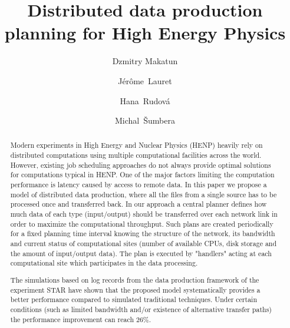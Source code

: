 \documentclass{svjour3}                     %
\begin{document}
\title{Distributed data production planning for High Energy Physics}

\author{Dzmitry Makatun         \and
		J\'er\^ome~Lauret		\and
		Hana~Rudov\'a			\and
		Michal~\v{S}umbera	
}


\maketitle

\begin{abstract}
Modern experiments in High Energy and Nuclear Physics (HENP) heavily rely on distributed computations using multiple computational facilities across the world. However, existing job scheduling approaches do not always provide optimal solutions for computations typical in HENP. One of the major factors limiting the computation performance is latency caused by access to remote data. In this paper we propose a model of distributed data production, where all the files from a single source has to be processed once and transferred back. In our approach a central planner defines how much data of each type (input/output) should be transferred over each network link in order to maximize the computational throughput. Such plans are created periodically for a fixed planning time interval knowing the structure of the network, its bandwidth and current status of computational sites (number of available CPUs, disk storage and the amount of input/output data). The plan is executed by "handlers" acting at each computational site which participates in the data processing. 

The simulations based on log records from the data production framework of the experiment STAR have shown that the proposed model systematically provides a better performance compared to simulated traditional techniques. Under certain conditions (such as limited bandwidth and/or existence of alternative transfer paths) the performance improvement can reach 26\%. 
\end{abstract}
\end{document}
